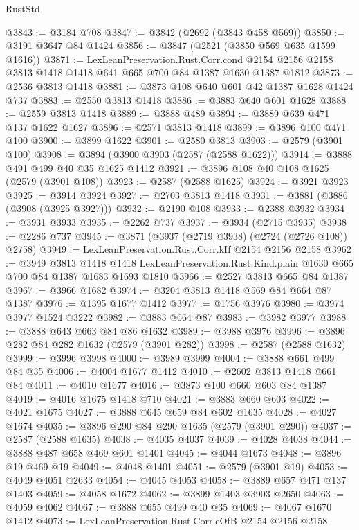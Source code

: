 \begin{lexlean}{RustStd}
\begin{coremodule}
@3843 := @3184 @708
@3847 := @3842 (@2692 (@3843 @458 @569))
@3850 := @3191 @3647 @84 @1424
@3856 := @3847 (@2521 (@3850 @569 @635 @1599 @1616))
@3871 := LexLeanPreservation.Rust.Corr.cond
    @2154
    @2156
    @2158
    @3813
    @1418
    @1418
    @641
    @665
    @700
    @84
    @1387
    @1630
    @1387
    @1812
@3873 := @2536 @3813 @1418
@3881 := @3873 @108 @640 @601 @42 @1387 @1628 @1424 @737
@3883 := @2550 @3813 @1418
@3886 := @3883 @640 @601 @1628
@3888 := @2559 @3813 @1418
@3889 := @3888 @489
@3894 := @3889 @639 @471 @137 @1622 @1627
@3896 := @2571 @3813 @1418
@3899 := @3896 @100 @471 @100
@3900 := @3899 @1622
@3901 := @2580 @3813
@3903 := @2579 (@3901 @100)
@3908 := @3894 (@3900 @3903 (@2587 (@2588 @1622)))
@3914 := @3888 @491 @499 @40 @35 @1625 @1412
@3921 := @3896 @108 @40 @108 @1625 (@2579 (@3901 @108))
@3923 := @2587 (@2588 @1625)
@3924 := @3921 @3923
@3925 := @3914 @3924
@3927 := @2703 @3813 @1418
@3931 := @3881 (@3886 (@3908 (@3925 @3927)))
@3932 := @2190 @108
@3933 := @2388 @3932
@3934 := @3931 @3933
@3935 := @2262 @737
@3937 := @3934 (@2715 @3935)
@3938 := @2286 @737
@3945 := @3871 (@3937 (@2719 @3938) (@2724 (@2726 @108)) @2758)
@3949 := LexLeanPreservation.Rust.Corr.kIf @2154 @2156 @2158
@3962 := @3949
    @3813
    @1418
    @1418
    LexLeanPreservation.Rust.Kind.plain
    @1630
    @665
    @700
    @84
    @1387
    @1683
    @1693
    @1810
@3966 := @2527 @3813 @665 @84 @1387
@3967 := @3966 @1682
@3974 := @3204 @3813 @1418 @569 @84 @664 @87 @1387
@3976 := @1395 @1677 @1412
@3977 := @1756 @3976
@3980 := @3974 @3977 @1524 @3222
@3982 := @3883 @664 @87
@3983 := @3982 @3977
@3988 := @3888 @643 @663 @84 @86 @1632
@3989 := @3988 @3976
@3996 := @3896 @282 @84 @282 @1632 (@2579 (@3901 @282))
@3998 := @2587 (@2588 @1632)
@3999 := @3996 @3998
@4000 := @3989 @3999
@4004 := @3888 @661 @499 @84 @35
@4006 := @4004 @1677 @1412
@4010 := @2602 @3813 @1418 @661 @84
@4011 := @4010 @1677
@4016 := @3873 @100 @660 @603 @84 @1387
@4019 := @4016 @1675 @1418 @710
@4021 := @3883 @660 @603
@4022 := @4021 @1675
@4027 := @3888 @645 @659 @84 @602 @1635
@4028 := @4027 @1674
@4035 := @3896 @290 @84 @290 @1635 (@2579 (@3901 @290))
@4037 := @2587 (@2588 @1635)
@4038 := @4035 @4037
@4039 := @4028 @4038
@4044 := @3888 @487 @658 @469 @601 @1401
@4045 := @4044 @1673
@4048 := @3896 @19 @469 @19
@4049 := @4048 @1401
@4051 := @2579 (@3901 @19)
@4053 := @4049 @4051 @2633
@4054 := @4045 @4053
@4058 := @3889 @657 @471 @137 @1403
@4059 := @4058 @1672
@4062 := @3899 @1403 @3903 @2650
@4063 := @4059 @4062
@4067 := @3888 @655 @499 @40 @35
@4069 := @4067 @1670 @1412
@4073 := LexLeanPreservation.Rust.Corr.eOfB @2154 @2156 @2158

\end{coremodule}
\end{lexlean}
